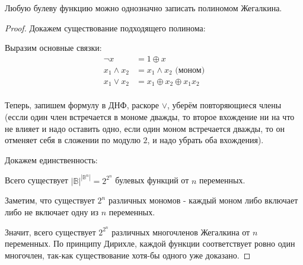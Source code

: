 \begin{theorem} \thmslashn

    Любую булеву функцию можно однозначно записать полиномом Жегалкина.

    \begin{proof} \thmslashn
    
        Докажем существование подходящего полинома:

        Выразим основные связки:
        \begin{equation*}
            \begin{split} 
                \neg x &= 1 \oplus x\\
                x_1 \land x_2 &= x_1 \land x_2 \text{ (моном)}\\
                x_1 \lor x_2 &= x_1 \oplus x_2 \oplus x_1x_2\\
            \end{split}
        \end{equation*}

        Теперь, запишем формулу в ДНФ, раскоре $\lor$, уберём повторяющиеся члены (ессли один член встречается в мономе дважды, то второе вхождение ни на что не влияет и надо оставить одно, если один моном встречается дважды, то он отменяет себя в сложении по модулю $2$, и надо убрать оба вхождения).

        Докажем единственность:

        Всего существует $|\mathbb{B}|^{|\mathbb{B}^{n}|} = 2^{2^{n}}$ булевых функций от $n$ переменных.

        Заметим, что существует $2^{n}$ различных мономов - каждый моном либо включает либо не включает одну из $n$ переменных.

        Значит, всего существует $2^{2^{n}}$ различных многочленов Жегалкина от $n$ переменных. По принципу Дирихле, каждой функции соответствует ровно один многочлен, так-как существование хотя-бы одного уже доказано.


    \end{proof}
\end{theorem}


